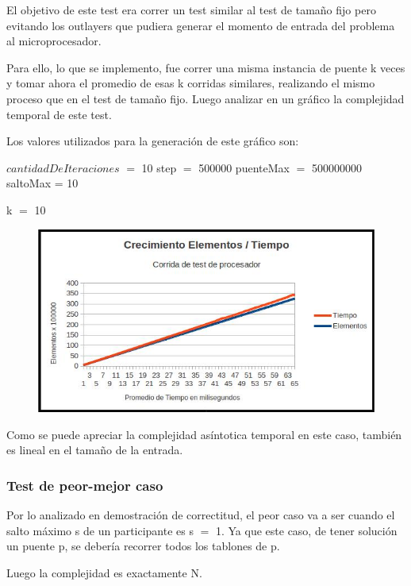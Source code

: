 El objetivo de este test era correr un test similar al test de tamaño fijo pero evitando los outlayers que pudiera generar el momento de entrada del problema al microprocesador. 

Para ello, lo que se implemento, fue correr una misma instancia de puente k veces y tomar ahora el promedio de esas k corridas similares, realizando el mismo proceso que en el test de tamaño fijo. Luego analizar en un gr\'afico la complejidad temporal de este test.

Los valores utilizados para la generaci\'on de este gr\'afico son:

$cantidadDeIteraciones$ $=$ 10 step $=$ 500000 puenteMax $=$ 500000000 saltoMax = 10 

k $=$ 10


\begin{figure}[ht]
	\begin{minipage}[t]{\linewidth}
		\centering
		\includegraphics[width=\textwidth]{grafico_de_entrada_al_procesador.jpg}
	\end{minipage}	
\end{figure}

Como se puede apreciar la complejidad as\'intotica temporal en este caso, tambi\'en es lineal en el tamaño de la entrada.


\subsubsection{Test de peor-mejor caso}

Por lo analizado en demostraci\'on de correctitud, el peor caso va a ser cuando el salto m\'aximo s de un participante es s $=$ 1. Ya que este caso, de tener soluci\'on un puente p, se deber\'ia recorrer todos los tablones de p.

Luego la complejidad es exactamente N.

